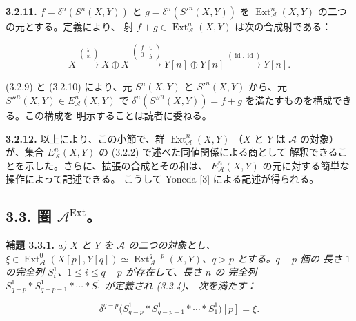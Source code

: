 \clearpage
{}%
\begingroup\small\setlength{\parskip}{0pt}\setlength{\emergencystretch}{1.5em}
\setlength{\abovedisplayskip}{4pt plus 2pt minus 2pt}%
\setlength{\belowdisplayskip}{4pt plus 2pt minus 2pt}%

\medskip\noindent\textbf{3.2.11.}\quad
$f=\delta^n(S^n(X,Y))$ と $g=\delta^n({S'}^n(X,Y))$ を
$\operatorname{Ext}_{\mathcal A}^{n}(X,Y)$ の二つの元とする。定義により、
射 $f+g\in\operatorname{Ext}_{\mathcal A}^{n}(X,Y)$ は次の合成射である：

\[
X\xrightarrow{\binom{\operatorname{id}}{\operatorname{id}}}X\oplus X
\xrightarrow{\begin{pmatrix}f&0\\0&g\end{pmatrix}}
Y[n]\oplus Y[n]
\xrightarrow{(\operatorname{id},\operatorname{id})}Y[n].
\]

(3.2.9) と (3.2.10) により、元 $S^n(X,Y)$ と ${S'}^n(X,Y)$ から、元
${S''}^n(X,Y)\in E_{\mathcal A}^{n}(X,Y)$ で
$\delta^n({S''}^n(X,Y))=f+g$ を満たすものを構成できる。この構成を
明示することは読者に委ねる。

\medskip\noindent\textbf{3.2.12.}\quad
以上により、この小節で、群 $\operatorname{Ext}_{\mathcal A}^{n}(X,Y)$
（$X$ と $Y$ は $\mathcal A$ の対象）が、集合
$E_{\mathcal A}^{n}(X,Y)$ の (3.2.2) で述べた同値関係による商として
解釈できることを示した。さらに、拡張の合成とその和は、
$E_{\mathcal A}^{n}(X,Y)$ の元に対する簡単な操作によって記述できる。
こうして Yoneda [3] による記述が得られる。

\subsection*{3.3. 圏
\texorpdfstring{$\mathcal A^{\operatorname{Ext}}$}{A Ext}。}

\medskip\noindent\textbf{補題 3.3.1.}\quad
\textit{a) $X$ と $Y$ を $\mathcal A$ の二つの対象とし、
$\xi\in\operatorname{Ext}_{\mathcal A}^{0}(X[p],Y[q])\simeq
\operatorname{Ext}_{\mathcal A}^{q-p}(X,Y)$、$q>p$ とする。$q-p$ 個の
長さ $1$ の完全列 $S_i^1$、$1\leq i\leq q-p$ が存在して、長さ $n$ の
完全列 $S_{q-p}^1*S_{q-p-1}^1*\cdots*S_1^1$ が定義され (3.2.4)、
次を満たす：}

\begin{equation}
\delta^{q-p}\bigl(S_{q-p}^1*S_{q-p-1}^1*\cdots*S_1^1\bigr)[p]=\xi.
\tag{3.3.1.1}
\end{equation}


